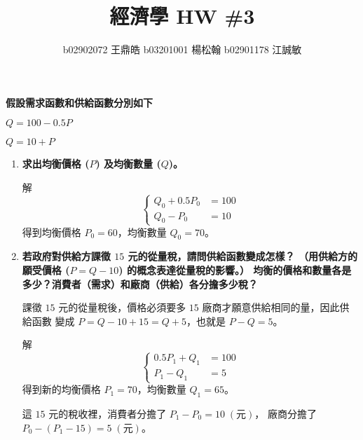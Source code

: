 \documentclass[12pt, a4paper]{article}
\title{\vspace{-1.5cm} 經濟學 HW \#3}
\author{b02902072 王鼎皓 \quad b03201001 楊松翰 \quad b02901178 江誠敏}
\begin{document}
\maketitle
{
  \bf 假設需求函數和供給函數分別如下
  \begin{description}[labelindent*=0cm, itemsep=0cm]
    \item[需求：] $ Q = 100 - 0.5 P $
    \item[供給：] $ Q = 10 + P $
  \end{description}
}


\begin{enumerate}[label=(\arabic*)]
  \item {\bf 求出均衡價格 ($P$) 及均衡數量 ($Q$)。}

    解
    \[
      \left\{
    \begin{align*}
      Q_0 + 0.5 P_0 &= 100 \\
      Q_0 - P_0 &= 10
    \end{align*}
      \right.
    \]
    得到均衡價格 $P_0 = 60$，均衡數量 $Q_0 = 70$。

  \item {\bf 若政府對供給方課徵 $15$ 元的從量稅，請問供給函數變成怎樣？
      （用供給方的願受價格 ($P=Q-10$) 的概念表達從量稅的影響。）
      均衡的價格和數量各是多少？消費者（需求）和廠商（供給）各分擔多少稅？}

    課徵 $15$ 元的從量稅後，價格必須要多 $15$ 廠商才願意供給相同的量，因此供給函數
    變成 $P = Q - 10 + 15 = Q + 5$，也就是 $P - Q = 5$。

    解
    \[
      \left\{
    \begin{align*}
      0.5 P_1 + Q_1 &= 100 \\
      P_1 - Q_1 &= 5
    \end{align*}
      \right.
    \]
    得到新的均衡價格 $P_1 = 70$，均衡數量 $Q_1 = 65$。
    
    這 $15$ 元的稅收裡，消費者分擔了 $P_1 - P_0 = 10 \; (\text{元})$，
    廠商分擔了 $P_0 - (P_1 - 15) = 5 \; (\text{元})$。


\end{enumerate}
\end{document}
